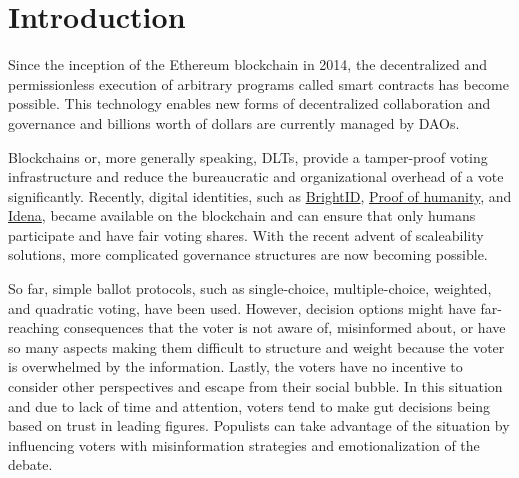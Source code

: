 \documentclass[%
aip,
amsmath,amssymb,
reprint,%
unsortedaddress,
nofootinbib
]{revtex4-2}
\begin{document}
\section{Introduction}

Since the inception of the Ethereum blockchain in 2014\cite{Wood2014}, 
the decentralized and permissionless execution of arbitrary programs 
called smart contracts has become possible. 
This technology enables new forms of decentralized collaboration 
and governance and billions worth of dollars are currently managed by \acp{DAO}.

Blockchains or, more generally speaking, \acp{DLT}, provide a tamper-proof voting infrastructure
and reduce the bureaucratic and organizational overhead of a vote significantly.
Recently, digital identities, such as \href{https://www.brightid.org/}{BrightID}, \href{https://www.proofofhumanity.id/}{Proof of humanity}, and \href{https://www.idena.io/}{Idena},  became available on the blockchain and can ensure that only humans participate and have fair voting shares.
With the recent advent of scaleability solutions,
more complicated governance structures are now becoming possible.

So far, simple ballot protocols, such as 
single-choice, 
multiple-choice, 
weighted,
and quadratic voting, 
have been used.
However, 
decision options might have far-reaching consequences that the voter is not aware of, misinformed about, 
or have so many aspects making them difficult to structure and weight because the voter is overwhelmed by the information.
Lastly, the voters have no incentive to consider other perspectives and escape from their social bubble. 
In this situation and due to lack of time and attention, voters tend to make gut decisions being based on trust in leading figures.
Populists can take advantage of the situation by influencing voters with misinformation strategies and emotionalization of the debate.
\end{document}
